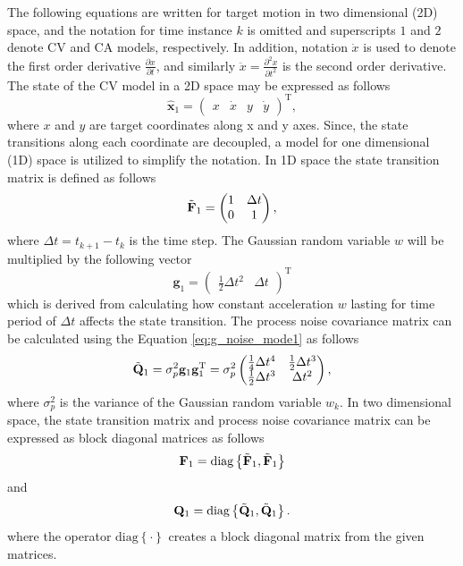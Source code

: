 \documentclass[english, 12pt, a4paper, elec, utf8, a-1b, online]{aaltothesis}
\renewcommand{\vec}[1]{\mathbf{#1}}
\newcommand{\transpose}[1]{#1^\text{T}}
\newcommand{\dt}{\Delta t}
\newcommand{\diag}[1]{\text{diag}\left\{ #1 \right\}}
\begin{document}
The following equations are written for target motion in two dimensional (2D) space, and
the notation for time instance $k$ is omitted and superscripts $1$ and $2$ denote CV and CA models, respectively. 
In addition, notation $\dot{x}$ is used to denote the first order derivative $\frac{\partial x}{\partial t}$, and similarly $\ddot{x}=\frac{\partial^2 x}{\partial t^2}$ is the second order derivative.
The state of the CV model in a 2D space may be expressed as follows
\begin{equation}\label{eq:x_mode1}
    \hat{\mathbf{x}}_1 =
        \transpose{
        \begin{pmatrix}
            x & \dot{x} & y & \dot{y}
    \end{pmatrix}},
\end{equation}
where $x$ and $y$ are target coordinates along x and y axes. 
Since, the state transitions along each coordinate are decoupled, a model for one dimensional (1D) space is utilized to simplify the notation.
In 1D space the state transition matrix is defined as follows
\begin{equation}\label{eq:f_mode1}
    \Tilde{\vec{F}}_1 =
    \begin{pmatrix}
        1 & \dt \\
        0 & 1  \\
    \end{pmatrix},
\end{equation}
where $\dt=t_{k+1} - t_k$ is the time step.
The Gaussian random variable $w$ will be multiplied by the following vector
\begin{equation}\label{eq:g_noise_mode1}
\vec{g}_1 =\transpose{\begin{pmatrix}
        \frac{1}{2} \dt^2 & \dt
    \end{pmatrix}}
\end{equation}
which is derived from calculating how constant acceleration $w$ lasting for time period of $\dt$ affects the state transition.
The process noise covariance matrix can be calculated using the Equation \eqref{eq:g_noise_mode1} as follows  
\begin{equation}
    \Tilde{\vec{Q}}_1 = \sigma_p^2 \vec{g}_1 \transpose{\vec{g}_1}
    = \sigma_p^2
    \begin{pmatrix}
        \frac{1}{4} \dt^4 & \frac{1}{2} \dt^3 \\ 
        \frac{1}{2} \dt^3 & \dt^2 \\ 
    \end{pmatrix},
\end{equation}
where $\sigma_p^2$ is the variance of the Gaussian random variable $w_k$.
In two dimensional space, the state transition matrix and process noise covariance matrix can be expressed as block diagonal matrices as follows 
\begin{equation}\label{eq:F_mode1}
\vec{F}_1 = \diag{\Tilde{\vec{F}}_1, \Tilde{\vec{F}}_1}
\end{equation}
and
\begin{equation}
    \vec{Q}_1 = \diag{\Tilde{\vec{Q}}_1, \Tilde{\vec{Q}}_1}.
\end{equation}
where the operator $\diag{\cdot}$ creates a block diagonal matrix from the given matrices.
\end{document}
